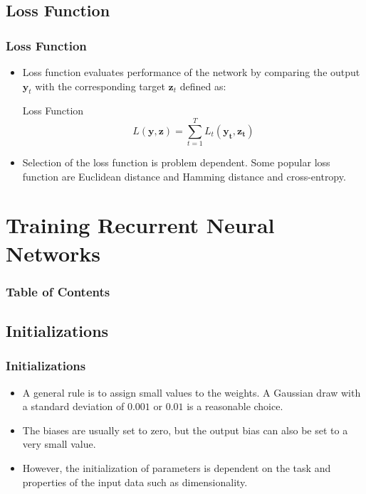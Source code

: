 \documentclass[
	11pt,
]{beamer}
\begin{document}
\subsection{Loss Function}

\begin{frame}
	\frametitle{Loss Function}
	\begin{itemize}
		\item Loss function evaluates performance of the network by comparing the output $\mathbf{y}_t$ with the corresponding target $\mathbf{z}_t$
		defined as:
		\bigskip
	\begin{block}{Loss Function}
		\begin{equation*}
			L(\mathbf{y,z}) = \sum_{t=1}^T L_t(\mathbf{y_t, z_t})
		\end{equation*}
	\end{block}
		\bigskip
		\item Selection of the loss function is problem dependent. Some
	popular loss function are Euclidean distance and Hamming distance and cross-entropy.
\end{itemize}
\end{frame}




\section{Training Recurrent Neural Networks}
\begin{frame}
	\frametitle{Table of Contents}
	\tableofcontents[currentsection]
\end{frame}

\subsection{Initializations}

\begin{frame}
	\frametitle{Initializations}

	\begin{itemize}
		\item A general rule is to assign small values to the weights. A
		Gaussian draw with a standard deviation of $0.001$ or $0.01$ is a reasonable choice.
		\bigskip
		\item The biases are usually set to zero,
		but the output bias can also be set to a very small value.
		\bigskip
		\item However, the initialization of parameters is dependent on the
		task and properties of the input data such as dimensionality. 
	\end{itemize}

\end{frame}
\end{document}
